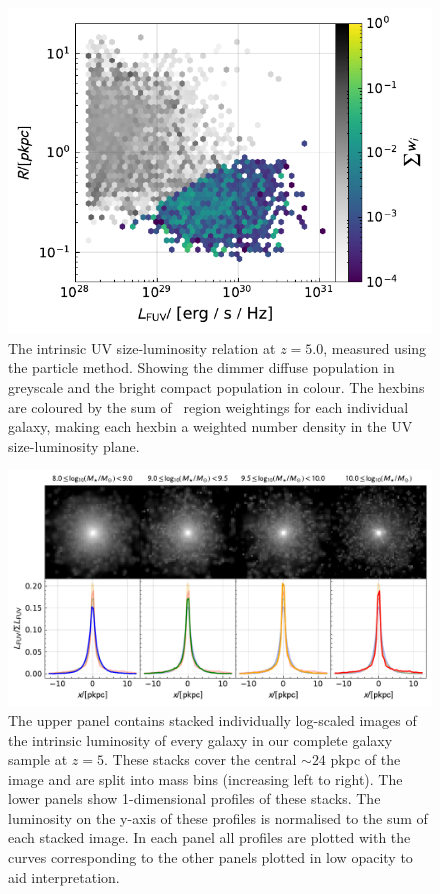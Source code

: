 \begin{figure}
	\includegraphics[width=\linewidth]{Figures/HalfLightRadius_part_FAKE.TH.FUV_5.0_sim_Intrinsic_default.pdf}
    \caption{The intrinsic UV size-luminosity relation at $z=5.0$, measured using the particle method. Showing the dimmer diffuse population in greyscale and the bright compact population in colour. The hexbins are coloured by the sum of \flares\ region weightings for each individual galaxy, making each hexbin a weighted number density in the UV size-luminosity plane.}
    \label{fig:int_hlr}
\end{figure}

\begin{figure}
	\includegraphics[width=\linewidth]{Figures/StackLogImgRow_FAKE.TH.FUV_00_010_z005p000_sim_Intrinsic_default.pdf}
    \caption{The upper panel contains stacked individually log-scaled images of the intrinsic luminosity of every galaxy in our complete galaxy sample at $z=5$. These stacks cover the central $\sim24$ pkpc of the image and are split into mass bins (increasing left to right). The lower panels show 1-dimensional profiles of these stacks. The luminosity on the y-axis of these profiles is normalised to the sum of each stacked image. In each panel all profiles are plotted with the curves corresponding to the other panels plotted in low opacity to aid interpretation.}
    \label{fig:int_stack}
\end{figure}

